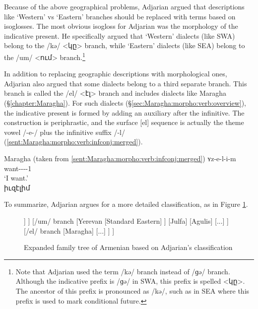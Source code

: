 Because of the above geographical problems, Adjarian argued that descriptions like `Western' vs `Eastern' branches should be replaced with terms based on isoglosses. The most obvious isogloss for Adjarian was the morphology of the indicative present. He specifically argued that `Western' dialects (like SWA) belong to the /kə/ <կը> branch, while `Eastern' dialects (like SEA) belong to the /um/ <ում> branch.\footnote{Note that Adjarian used the term /kə/ branch instead of /ɡə/ branch. Although the indicative prefix is /ɡə/ in SWA, this prefix is spelled <կը>. The ancestor of this prefix is pronounced as /kə/, such as in SEA where this prefix is used to mark conditional future.}

In addition to replacing geographic descriptions with morphological ones, Adjarian also argued that some dialects belong to a third separate branch. This branch is called the /el/ <էլ> branch and includes dialects like Maragha (\S\ref{chapter:Maragha}). For such dialects (\S\ref{sec:Maragha:morpho:verb:overview}), the indicative present is formed by adding an auxiliary after the infinitive. The construction is periphrastic, and the surface [el] sequence is actually the theme vowel /-e-/ plus the infinitive suffix /-l/ (\ref{sent:Maragha:morpho:verb:infconj:merged}). 

\begin{exe}
		\ex Maragha (taken from \ref{sent:Maragha:morpho:verb:infconj:merged})
	 \gll ʏz-e-l-i-m \\
			want-{\thgloss}-{\infgloss}-{\aux}-1{\sg} \\
			\trans `I want.'\\
			իւզէլիմ \label{sent:Maragha:morpho:verb:infconj:merged REP in intro} 
			
	
\end{exe}

To summarize, Adjarian argues for a more detailed classification, as in Figure \ref{tree:dialect:adj}. 

\begin{figure}[H]
	\caption{Expanded family tree of Armenian based on Adjarian's classification}
	\label{tree:dialect:adj}
	\centering
	\begin{forest}
		[{Classical Armenian} [/kə/ branch [... ] [Trabzon ] [Crimea ] [Istanbul [{Standard Western}] ] ] [/um/ branch [Yerevan [{Standard Eastern}] ] [Julfa] [Agulis] [...] ] [/el/ branch [Maragha] [...] ] ]
	\end{forest}
	
\end{figure}

